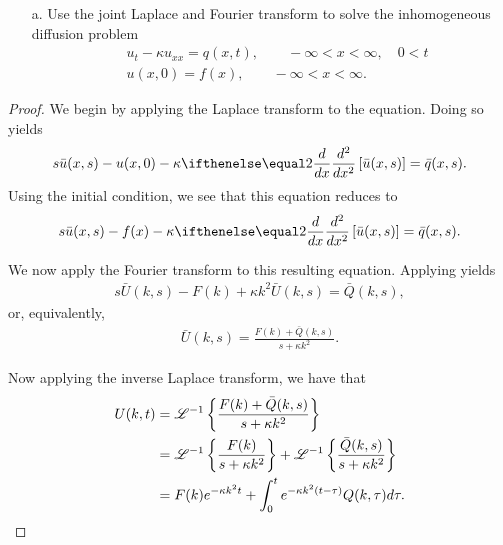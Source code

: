 \begin{problem}{4.50}
  \begin{enumerate}
    \item[a.] Use the joint Laplace and Fourier transform to solve the inhomogeneous diffusion problem
      \begin{align*}
        & u_t - \kappa u_{xx} = q(x, t), \qquad -\infty < x < \infty, \quad 0 < t\\
        & u(x, 0) = f(x), \qquad -\infty < x < \infty.
      \end{align*}
  \end{enumerate}
\end{problem}

\begin{proof}
  We begin by applying the Laplace transform to the equation. Doing so yields
  \begin{align*}
    s \bar{u}(x, s) - u(x, 0) - \kappa \der{x}{2}\left[\bar{u}(x, s)\right] = \bar{q}(x, s).
  \end{align*}
  Using the initial condition, we see that this equation reduces to
  \begin{align*}
    s \bar{u}(x, s) - f(x) - \kappa \der{x}{2}\left[\bar{u}(x, s)\right] = \bar{q}(x, s).
  \end{align*}

  We now apply the Fourier transform to this resulting equation. Applying yields
  \begin{align*}
    s \bar{U}(k, s) - F(k) + \kappa k^2 \bar{U}(k, s) = \bar{Q}(k, s),
  \end{align*}
  or, equivalently,
  \begin{align*}
    \bar{U}(k, s) = \frac{F(k) + \bar{Q}(k, s)}{s + \kappa k ^2}.
  \end{align*}

  Now applying the inverse Laplace transform, we have that
  \begin{align*}
    U(k, t) &= \mathscr{L}^{-1}\left\{ {\frac{F(k) + \bar{Q}(k, s)}{s + \kappa k ^2}} \right\} \\
    &= \mathscr{L}^{-1}\left\{ {\frac{F(k)}{s + \kappa k ^2}} \right\} + \mathscr{L}^{-1}\left\{ {\frac{ \bar{Q}(k, s)}{s + \kappa k ^2}} \right\} \\
    &= F(k) e^{-\kappa k^2 t} + \int_0^te^{-\kappa k^2 (t-\tau)}Q(k, \tau) d\tau.
  \end{align*}


\end{proof}
